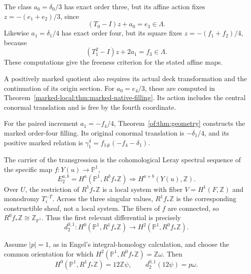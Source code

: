 \documentclass[11pt]{article}
\numberwithin{equation}{section}
\begin{document}
The class $a_0=\delta_0/3$ has exact order three, but its affine action
fixes $z=-(e_1+e_2)/3$, since
\[
             (T_0-I)z+a_0=e_3\in\Lambda.
\]
Likewise $a_1=\delta_1/4$ has exact order four, but its square fixes
$z=-(f_1+f_2)/4$, because
\[
             (T_1^2-I)z+2a_1=f_3\in\Lambda.
\]
These computations give the freeness criterion for the stated affine
maps.

A positively marked quotient also requires its actual deck
transformation and the continuation of its origin section. For
$a_0=e_4/3$, these are computed in
Theorem~\ref{marked-local:thm:marked-native-filling}. Its action includes
the central conormal translation and is free by the fourth coordinate.

For the paired increment $a_1=-f_4/4$, Theorem~\ref{of:thm:geometry}
constructs the marked order-four filling. Its original conormal
translation is $-\delta_1/4$, and its positive marked relation is
$\gamma_1^4=f_{1\#}(-f_4-\delta_1)$.

The carrier of the transgression is the cohomological Leray spectral
sequence of the specific map $f:Y(u)\to\mathbb P^1$,
\[
 E_2^{a,b}=H^a(\mathbb P^1,R^bf_*\mathbb Z)
       \Longrightarrow H^{a+b}(Y(u),\mathbb Z).                   \tag{5.2}
\]
Over $U$, the restriction of $R^1f_*\mathbb Z$ is a local system with
fiber $V=H^1(F,\mathbb Z)$ and monodromy $T_i^{-T}$.  Across the three
singular values, $R^1f_*\mathbb Z$ is the corresponding constructible
sheaf, not a local system.  The fibers of $f$ are connected, so
$R^0f_*\mathbb Z\cong\mathbb Z_{\mathbb P^1}$.  Thus the first relevant
differential is precisely
\[
 d_2^{0,1}:H^0(\mathbb P^1,R^1f_*\mathbb Z)
       \longrightarrow H^2(\mathbb P^1,R^0f_*\mathbb Z).          \tag{5.3}
\]

\begin{theorem}
Assume $|p|=1$, as in Engel's integral-homology calculation, and choose the
common orientation for which
$H^2(\mathbb P^1,R^0f_*\mathbb Z)=\mathbb Z\omega$.  Then
\[
 H^0(\mathbb P^1,R^1f_*\mathbb Z)=12\mathbb Z\psi,
 \qquad
                  d_2^{0,1}(12\psi)=p\omega.                      \tag{5.4}
\]
\end{theorem}
\end{document}
